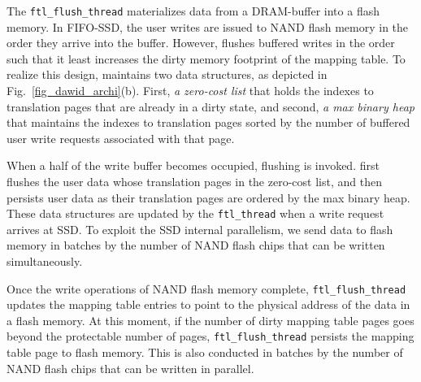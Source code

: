 The \texttt{ftl\_flush\_thread} materializes data from a DRAM-buffer
into a flash memory.  In FIFO-SSD, the user writes are issued
to NAND flash memory in the order they arrive into the buffer. However, \ours{}
flushes buffered writes in the order such that it least increases the dirty memory
footprint of the mapping table.  To realize this design, \ours{} maintains two
data structures, as depicted in Fig.~\ref{fig_dawid_archi}(b). First, \textit{a
zero-cost list} that holds the indexes to translation pages that are already
in a dirty state, and second, \textit{a max binary heap} that
maintains the indexes to translation pages sorted by the number of buffered
user write requests associated with that page.  

When a half of the write buffer becomes occupied, flushing is invoked. \ours{}
first flushes the user data whose translation pages in the zero-cost list, and then
persists user data as their translation pages are ordered by the max binary
heap. 
These data structures are updated by the \texttt{ftl\_thread} 
when a write request arrives at SSD. 
To exploit the SSD internal parallelism, we send data to flash memory in
batches by the number of NAND flash chips that can be written simultaneously.

Once the write operations of NAND flash memory complete,
\texttt{ftl\_flush\_thread} updates the mapping table entries to point to the
physical address of the data in a flash memory.  At this moment, if the number
of dirty mapping table pages goes beyond the protectable number of pages,
\texttt{ftl\_flush\_thread} persists the mapping table page to flash memory.
This is also conducted in batches by the number of NAND flash chips that can be
written in parallel.
